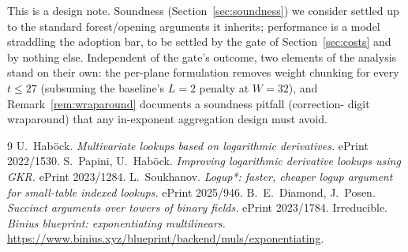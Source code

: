 \documentclass[11pt]{article}
\theoremstyle{definition}
\begin{document}
This is a design note. Soundness (Section~\ref{sec:soundness}) we
consider settled up to the standard forest/opening arguments it inherits;
performance is a model straddling the adoption bar, to be settled by the
gate of Section~\ref{sec:costs} and by nothing else. Independent of the
gate's outcome, two elements of the analysis stand on their own: the
per-plane formulation removes weight chunking for every $t\le 27$
(subsuming the baseline's $L{=}2$ penalty at $W{=}32$), and
Remark~\ref{rem:wraparound} documents a soundness pitfall (correction-
digit wraparound) that any in-exponent aggregation design must avoid.

\begin{thebibliography}{9}\small
{} U.~Hab\"ock.
\emph{Multivariate lookups based on logarithmic derivatives.}
ePrint 2022/1530.
 S.~Papini, U.~Hab\"ock.
\emph{Improving logarithmic derivative lookups using GKR.}
ePrint 2023/1284.
 L.~Soukhanov.
\emph{Logup*: faster, cheaper logup argument for small-table indexed
lookups.} ePrint 2025/946.
 B.~E.~Diamond, J.~Posen.
\emph{Succinct arguments over towers of binary fields.}
ePrint 2023/1784.
 Irreducible.
\emph{Binius blueprint: exponentiating multilinears.}
\url{https://www.binius.xyz/blueprint/backend/muls/exponentiating}.
\end{thebibliography}
\end{document}
